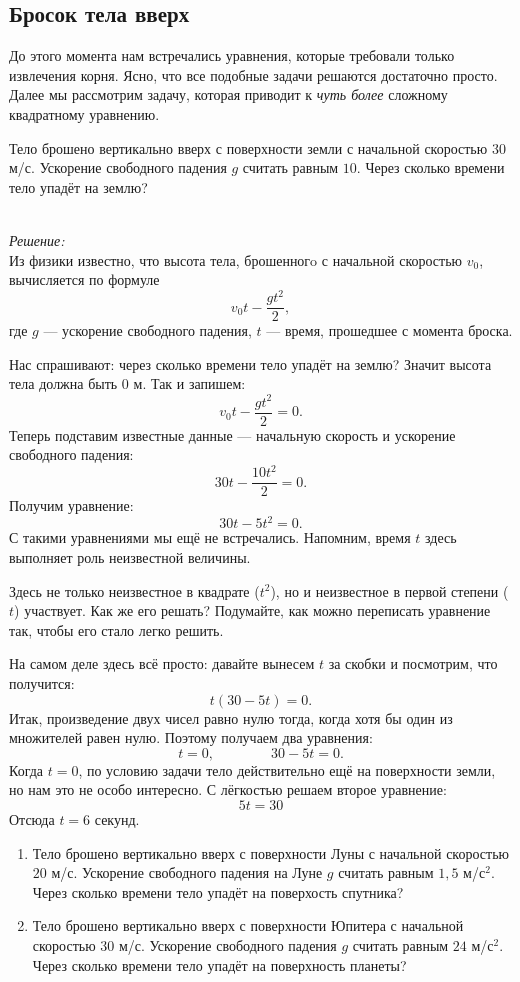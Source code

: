 \documentclass[11pt,fleqn]{book} %
\begin{document}

\subsection{Бросок тела вверх}

До этого момента нам встречались уравнения, которые требовали только извлечения корня. Ясно, что все подобные задачи решаются достаточно просто. Далее мы рассмотрим задачу, которая приводит к \textit{чуть более} сложному квадратному уравнению.

\begin{problem}

Тело брошено вертикально вверх с поверхности земли с начальной скоростью $30$ м/с. Ускорение свободного падения $g$ считать равным $10$. Через сколько времени тело упадёт на землю?

\end{problem}
~\\ \textit{Решение:} ~\\
Из физики известно, что высота тела, брошенногo с начальной скоростью $v_0$, вычисляется по формуле $$v_0t - \frac{gt^2}{2},$$ где $g$ --- ускорение свободного падения, $t$ --- время, прошедшее с момента броска.

Нас спрашивают: через сколько времени тело упадёт на землю? Значит высота тела должна быть $0$ м. Так и запишем: $$v_0t - \frac{gt^2}{2} = 0.$$ Теперь подставим известные данные --- начальную скорость и ускорение свободного падения: 
$$30t - \frac{10t^2}{2} = 0.$$
Получим уравнение:
$$30t - {5t^2} = 0.$$
С такими уравнениями мы ещё не встречались. Напомним, время $t$ здесь выполняет роль неизвестной величины. 

Здесь не только неизвестное в квадрате ($t^2$), но и неизвестное в первой степени ($t$) участвует. Как же его решать? Подумайте, как можно переписать уравнение так, чтобы его стало легко решить.

На самом деле здесь всё просто: давайте вынесем $t$ за скобки и посмотрим, что получится: $$t(30 - 5t) = 0 .$$ Итак, произведение двух чисел равно нулю тогда, когда хотя бы один из множителей равен нулю. Поэтому получаем два уравнения: $$t = 0, \qquad \qquad 30 - 5t = 0.$$
Когда $t = 0$, по условию задачи тело действительно ещё на поверхности земли, но нам это не особо интересно. С лёгкостью решаем второе уравнение:
$$5t = 30$$
Отсюда $t = 6$ секунд.

\begin{exercise}
\begin{enumerate}
\item Тело брошено вертикально вверх с поверхности Луны с начальной скоростью $20$ м/с. Ускорение свободного падения на Луне $g$ считать равным $1,5$ м/с$^2$. Через сколько времени тело упадёт на поверхость спутника?
\item Тело брошено вертикально вверх с поверхности Юпитера с начальной скоростью $30$ м/с. Ускорение свободного падения $g$ считать равным $24$ м/с$^2$. Через сколько времени тело упадёт на поверхность планеты?
\end{enumerate}
\end{exercise}
\end{document}
